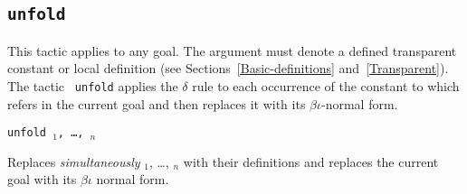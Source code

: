 \begin{coq_example*}

\subsection{\tt unfold \qualid
{}
\label{unfold}}

This tactic applies to any goal. The argument {\qualid} must denote a
defined transparent constant or local definition (see Sections~\ref{Basic-definitions} and~\ref{Transparent}).  The tactic {\tt
  unfold} applies the $\delta$ rule to each occurrence of the constant
to which {\qualid} refers in the current goal and then replaces it
with its $\beta\iota$-normal form.

\begin{ErrMsgs}
\item {\qualid} 

\end{ErrMsgs}

\begin{Variants}
\item {\tt unfold {\qualid}$_1$, \dots, \qualid$_n$}

  Replaces {\em simultaneously} {\qualid}$_1$, \dots, {\qualid}$_n$
  with their definitions and replaces the current goal with its
  $\beta\iota$ normal form.


\end{Variants}
\end{coq_example*}
